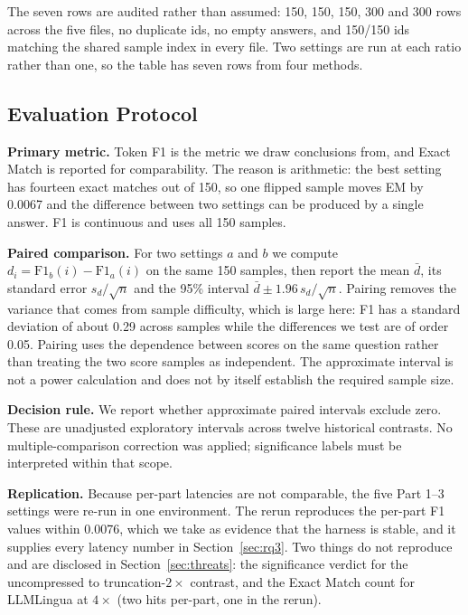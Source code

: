 ﻿\documentclass[10pt,a4paper,twocolumn]{article}
\begin{document}
The seven rows are audited rather than assumed: 150, 150, 150, 300 and 300 rows
across the five files, no duplicate ids, no empty answers, and 150/150 ids
matching the shared sample index in every file. Two settings are run at each ratio
rather than one, so the table has seven rows from four methods.

\subsection{Evaluation Protocol}
\label{sec:protocol}

\textbf{Primary metric.} Token F1 is the metric we draw conclusions from, and
Exact Match is reported for comparability. The reason is arithmetic: the best
setting has fourteen exact matches out of 150, so one flipped sample moves EM by
0.0067 and the difference between two settings can be produced by a single answer.
F1 is continuous and uses all 150 samples.

\textbf{Paired comparison.} For two settings $a$ and $b$ we compute
$d_i = \mathrm{F1}_b(i) - \mathrm{F1}_a(i)$ on the same 150 samples, then report
the mean $\bar d$, its standard error $s_d/\sqrt{n}$ and the 95\% interval
$\bar d \pm 1.96\,s_d/\sqrt{n}$. Pairing removes the variance that comes from
sample difficulty, which is large here: F1 has a standard deviation of about 0.29
across samples while the differences we test are of order 0.05. Pairing uses the dependence between scores on the same question rather than
treating the two score samples as independent. The approximate interval is not a
power calculation and does not by itself establish the required sample size.

\textbf{Decision rule.} We report whether approximate paired intervals exclude
zero. These are unadjusted exploratory intervals across twelve historical
contrasts. No multiple-comparison correction was applied; significance labels
must be interpreted within that scope.

\textbf{Replication.} Because per-part latencies are not comparable, the five
Part 1--3 settings were re-run in one environment. The rerun reproduces the
per-part F1 values within 0.0076, which we take as evidence that the harness is
stable, and it supplies every latency number in Section~\ref{sec:rq3}. Two things
do not reproduce and are disclosed in Section~\ref{sec:threats}: the significance
verdict for the uncompressed to truncation-$2\times$ contrast, and the Exact Match
count for LLMLingua at $4\times$ (two hits per-part, one in the rerun).
\end{document}
